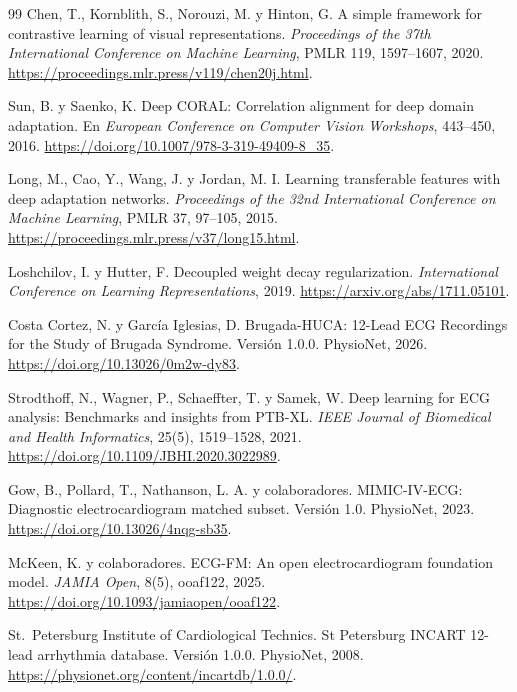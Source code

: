 \begin{thebibliography}{99}
Chen, T., Kornblith, S., Norouzi, M. y Hinton, G.
\newblock A simple framework for contrastive learning of visual representations.
\newblock \emph{Proceedings of the 37th International Conference on Machine Learning}, PMLR 119, 1597--1607, 2020.
\newblock \url{https://proceedings.mlr.press/v119/chen20j.html}.

Sun, B. y Saenko, K.
\newblock Deep CORAL: Correlation alignment for deep domain adaptation.
\newblock En \emph{European Conference on Computer Vision Workshops}, 443--450, 2016.
\newblock \url{https://doi.org/10.1007/978-3-319-49409-8_35}.

Long, M., Cao, Y., Wang, J. y Jordan, M. I.
\newblock Learning transferable features with deep adaptation networks.
\newblock \emph{Proceedings of the 32nd International Conference on Machine Learning}, PMLR 37, 97--105, 2015.
\newblock \url{https://proceedings.mlr.press/v37/long15.html}.

Loshchilov, I. y Hutter, F.
\newblock Decoupled weight decay regularization.
\newblock \emph{International Conference on Learning Representations}, 2019.
\newblock \url{https://arxiv.org/abs/1711.05101}.

\par\smallskip
{}
Costa Cortez, N. y García Iglesias, D.
\newblock Brugada-HUCA: 12-Lead ECG Recordings for the Study of Brugada Syndrome. Versión 1.0.0.
\newblock PhysioNet, 2026.
\newblock \url{https://doi.org/10.13026/0m2w-dy83}.

Strodthoff, N., Wagner, P., Schaeffter, T. y Samek, W.
\newblock Deep learning for ECG analysis: Benchmarks and insights from PTB-XL.
\newblock \emph{IEEE Journal of Biomedical and Health Informatics}, 25(5), 1519--1528, 2021.
\newblock \url{https://doi.org/10.1109/JBHI.2020.3022989}.

Gow, B., Pollard, T., Nathanson, L. A. y colaboradores.
\newblock MIMIC-IV-ECG: Diagnostic electrocardiogram matched subset. Versión 1.0.
\newblock PhysioNet, 2023.
\newblock \url{https://doi.org/10.13026/4nqg-sb35}.

McKeen, K. y colaboradores.
\newblock ECG-FM: An open electrocardiogram foundation model.
\newblock \emph{JAMIA Open}, 8(5), ooaf122, 2025.
\newblock \url{https://doi.org/10.1093/jamiaopen/ooaf122}.

St.~Petersburg Institute of Cardiological Technics.
\newblock St Petersburg INCART 12-lead arrhythmia database. Versión 1.0.0.
\newblock PhysioNet, 2008.
\newblock \url{https://physionet.org/content/incartdb/1.0.0/}.


\end{thebibliography}
